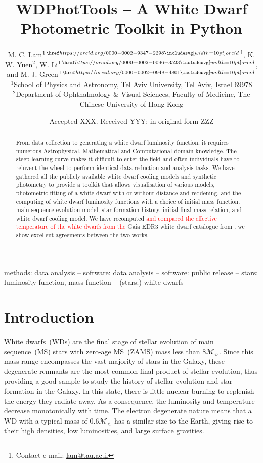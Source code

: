 \documentclass[fleqn,usenatbib]{rasti}
\title[WD Photometric Toolkit]{WDPhotTools -- A White Dwarf Photometric Toolkit in Python}
\author[M. C. Lam et al.]{
M. C. Lam$^{1\,\orcid{0000-0002-9347-2298}}$\thanks{Contact e-mail: \href{mailto:lam@tau.ac.il}{lam@tau.ac.il}},
K. W. Yuen$^{2}$,
W. Li$^{1\,\orcid{0000-0002-0096-3523}}$, and
M. J. Green$^{1\,\orcid{0000-0002-0948-4801}}$\\
$^{1}$School of Physics and Astronomy, Tel Aviv University, Tel Aviv, Israel 69978\\
$^{2}$Department of Ophthalmology \& Visual Sciences, Faculty of Medicine, The Chinese University of Hong Kong
}
\date{Accepted XXX. Received YYY; in original form ZZZ}
\newcommand{\msun}{\mathcal{M}_{\sun}}
\begin{document}
\label{firstpage}
\pagerange{\pageref{firstpage}--\pageref{lastpage}}
\maketitle

\begin{abstract}
From data collection to generating a white dwarf luminosity function, it
requires numerous Astrophysical, Mathematical and Computational domain
knowledge. The steep learning curve makes it difficult to enter the field and
often individuals have to reinvent the wheel to perform identical data reduction
and analysis tasks. We have gathered all the publicly available white dwarf
cooling models and synthetic photometry to provide a toolkit that allows
visualisation of various models, photometric fitting of a white dwarf with or
without distance and reddening, and the computing of white dwarf luminosity
functions with a choice of initial mass function, main sequence evolution model,
star formation history, initial-final mass relation, and white dwarf cooling
model. We have recomputed \textcolor{red}{and compared the effective temperature of the white
dwarfs from the} Gaia EDR3 white dwarf catalogue from \citet{2021MNRAS.508.3877G},
we show excellent agreements between the two works.
\end{abstract}

\begin{keywords}
methods: data analysis -- software: data analysis -- software: public release -- stars: luminosity function, mass function -- (stars:) white dwarfs
\end{keywords}


\section{Introduction}
White dwarfs~(WDs) are the final stage of stellar evolution of main
sequence~(MS) stars with zero-age MS~(ZAMS) mass less than $8\msun$. Since this
mass range encompasses the vast majority of stars in the Galaxy, these
degenerate remnants are the most common final product of stellar evolution,
thus providing a good sample to study the history of stellar evolution and star
formation in the Galaxy. In this state, there is little nuclear burning to
replenish the energy they radiate away. As a consequence, the luminosity and
temperature decrease monotonically with time. The electron degenerate nature
means that a WD with a typical mass of $0.6\mathcal{M}_{\sun}$ has a similar
size to the Earth, giving rise to their high densities, low luminosities, and
large surface gravities.
\end{document}
